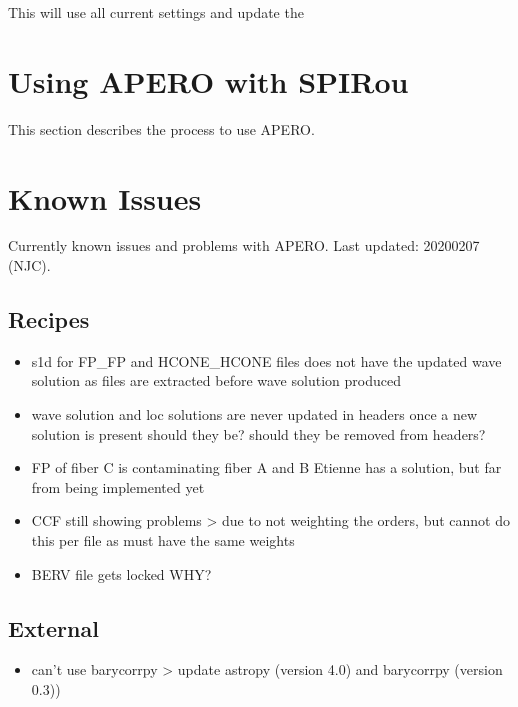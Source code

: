 \documentclass[a4paper,10pt,english]{report}
\begin{document}
This will use all current settings and update the


\section{Using APERO with SPIRou}
\label{\detokenize{user/general/using_apero_default:using-apero-with-spirou}}\label{\detokenize{user/general/using_apero_default:using-apero-default}}\label{\detokenize{user/general/using_apero_default::doc}}
This section describes the process to use APERO.


\section{Known Issues}
\label{\detokenize{user/general/known_issues:known-issues}}\label{\detokenize{user/general/known_issues:id1}}\label{\detokenize{user/general/known_issues::doc}}
Currently known issues and problems with APERO.
Last updated: 2020\sphinxhyphen{}02\sphinxhyphen{}07 (NJC).


\subsection{Recipes}
\label{\detokenize{user/general/known_issues:recipes}}\begin{itemize}
\item {} 
s1d for FP\_FP and HCONE\_HCONE files does not have the updated wave solution
as files are extracted before wave solution produced

\item {} 
wave solution and loc solutions are never updated in headers once a new
solution is present \sphinxhyphen{} should they be? should they be removed from headers?

\item {} 
FP of fiber C is contaminating fiber A and B \sphinxhyphen{} Etienne has a solution, but
far from being implemented yet

\item {} 
CCF still showing problems \textendash{}\textgreater{} due to not weighting the orders, but cannot
do this per file as must have the same weights

\item {} 
BERV file gets locked \sphinxhyphen{} WHY?

\end{itemize}


\subsection{External}
\label{\detokenize{user/general/known_issues:external}}\begin{itemize}
\item {} 
can’t use barycorrpy \textendash{}\textgreater{} update astropy (version 4.0) and barycorrpy (version 0.3))

\end{itemize}
\end{document}
